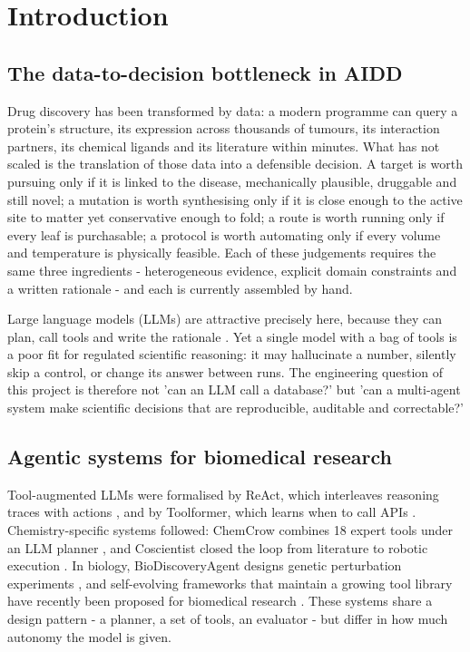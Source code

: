 \chapter{Introduction}\label{ch:1}

\section{The data-to-decision bottleneck in AIDD}

Drug discovery has been transformed by data: a modern programme can query a protein's structure, its expression across thousands of tumours, its interaction partners, its chemical ligands and its literature within minutes. What has not scaled is the translation of those data into a defensible decision. A target is worth pursuing only if it is linked to the disease, mechanically plausible, druggable and still novel; a mutation is worth synthesising only if it is close enough to the active site to matter yet conservative enough to fold; a route is worth running only if every leaf is purchasable; a protocol is worth automating only if every volume and temperature is physically feasible. Each of these judgements requires the same three ingredients - heterogeneous evidence, explicit domain constraints and a written rationale - and each is currently assembled by hand.

Large language models (LLMs) are attractive precisely here, because they can plan, call tools and write the rationale \cite{r01,r02}. Yet a single model with a bag of tools is a poor fit for regulated scientific reasoning: it may hallucinate a number, silently skip a control, or change its answer between runs. The engineering question of this project is therefore not 'can an LLM call a database?' but 'can a multi-agent system make scientific decisions that are reproducible, auditable and correctable?'

\section{Agentic systems for biomedical research}

Tool-augmented LLMs were formalised by ReAct, which interleaves reasoning traces with actions \cite{r01}, and by Toolformer, which learns when to call APIs \cite{r02}. Chemistry-specific systems followed: ChemCrow combines 18 expert tools under an LLM planner \cite{r03}, and Coscientist closed the loop from literature to robotic execution \cite{r04}. In biology, BioDiscoveryAgent designs genetic perturbation experiments \cite{r05}, and self-evolving frameworks that maintain a growing tool library have recently been proposed for biomedical research \cite{r06,r07}. These systems share a design pattern - a planner, a set of tools, an evaluator - but differ in how much autonomy the model is given.

